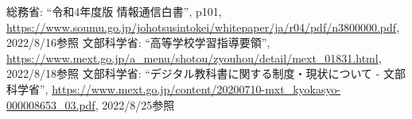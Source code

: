 \documentclass[12pt,a4j,titlepage]{ltjsarticle}
\begin{document}
\begin{thebibliography}{99}

 総務省: ``令和4年度版 情報通信白書'', p101,
\url{https://www.soumu.go.jp/johotsusintokei/whitepaper/ja/r04/pdf/n3800000.pdf}, 2022/8/16参照
 文部科学省: ``高等学校学習指導要領'', \url{https://www.mext.go.jp/a_menu/shotou/zyouhou/detail/mext_01831.html}, 2022/8/18参照
 文部科学省: ``デジタル教科書に関する制度・現状について - 文部科学省'', \url{https://www.mext.go.jp/content/20200710-mxt_kyokasyo-000008653_03.pdf}, 2022/8/25参照
\end{thebibliography}
\end{document}
